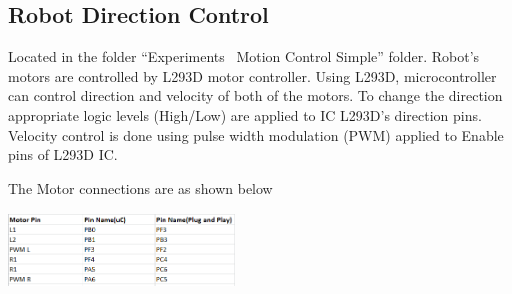 \documentclass[a4paper,10pt,oneside]{article}
\begin{document}
		\subsection{\huge \textbf{Robot Direction Control}}
			{Located in the folder “Experiments \ Motion Control Simple” folder. Robot’s motors are controlled by L293D motor controller. Using L293D, microcontroller can control direction and velocity of both of the motors. To change the direction appropriate logic levels (High/Low) are applied to IC L293D’s direction pins. Velocity control is done using pulse width modulation (PWM) applied to Enable pins of L293D IC.\\}
			
			The Motor connections are as shown below 
			
			\begin{center}
				\includegraphics[width=6cm, height=2cm]{MotorConnection}
			\end{center}
			
\end{document}
